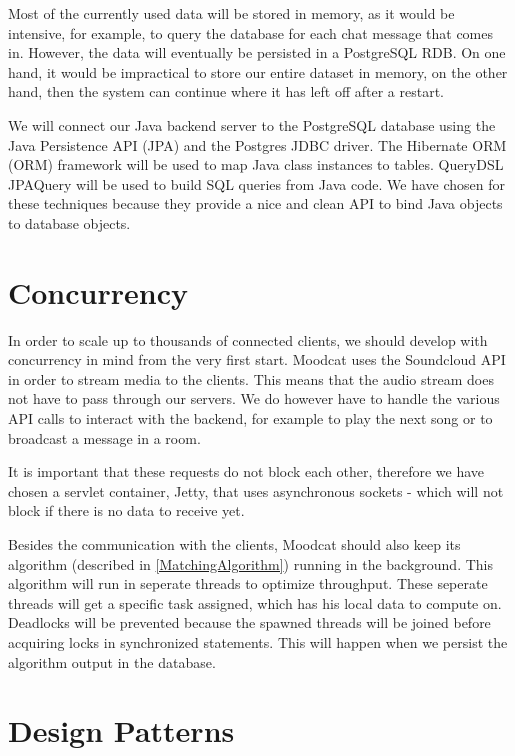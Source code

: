 \par
Most of the currently used data will be stored in memory, as it would be intensive, for example, to query the database for each chat message that comes in.
However, the data will eventually be persisted in a PostgreSQL\cite{PostgreSQL} \gls{RDB}.
On one hand, it would be impractical to store our entire dataset in memory, on the other hand, then the system can continue where it has left off after a restart.

\par
We will connect our Java backend server to the PostgreSQL database using the Java Persistence API (JPA) and the Postgres JDBC driver.
The Hibernate\cite{HibernateORM} \Gls{ORM} (ORM) framework will be used to map Java class instances to tables.
QueryDSL\cite{QueryDSL} JPAQuery will be used to build \Gls{SQL} queries from Java code.
We have chosen for these techniques because they provide a nice and clean API to bind Java objects to database objects.

\section{Concurrency}
In order to scale up to thousands of connected clients, we should develop with concurrency in mind from the very first start.
Moodcat uses the \gls{Soundcloud} API in order to stream media to the clients.
This means that the audio stream does not have to pass through our servers.
We do however have to handle the various API calls to interact with the backend, for example to play the next song or to broadcast a message in a room.

\par
It is important that these requests do not block each other, therefore we have chosen a servlet container, Jetty, that uses asynchronous sockets - which will not block if there is no data to receive yet.

\par
Besides the communication with the clients, Moodcat should also keep its algorithm (described in \ref{MatchingAlgorithm}) running in the background.
This algorithm will run in seperate threads to optimize throughput.
These seperate threads will get a specific task assigned, which has his local data to compute on.
Deadlocks will be prevented because the spawned threads will be joined before acquiring locks in synchronized statements.
This will happen when we persist the algorithm output in the database.

\section{Design Patterns}

